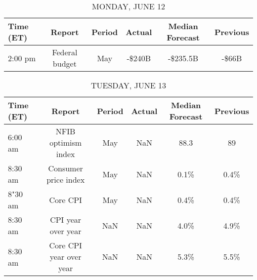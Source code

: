 \documentclass{article}%
\begin{document}
%
\normalsize%


\begin{table}[htbp]%
\caption{MONDAY, JUNE 12}%
\centering%
\begin{adjustbox}{width=1\textwidth}%
\begin{tabular}{lccccc}
\toprule
Time (ET) &         Report & Period & Actual & Median Forecast & Previous \\
\midrule
  2:00 pm & Federal budget &    May & -\$240B &        -\$235.5B &    -\$66B \\
\bottomrule
\end{tabular}
%
\end{adjustbox}%
\end{table}

%


\begin{table}[htbp]%
\caption{TUESDAY, JUNE 13}%
\centering%
\begin{adjustbox}{width=1\textwidth}%
\begin{tabular}{lccccc}
\toprule
Time (ET) &                  Report & Period & Actual & Median Forecast & Previous \\
\midrule
  6:00 am &     NFIB optimism index &    May &    NaN &            88.3 &       89 \\
  8:30 am &    Consumer price index &    May &    NaN &            0.1\% &     0.4\% \\
  8"30 am &                Core CPI &    May &    NaN &            0.4\% &     0.4\% \\
  8:30 am &      CPI year over year &    NaN &    NaN &            4.0\% &     4.9\% \\
  8:30 am & Core CPI year over year &    NaN &    NaN &            5.3\% &     5.5\% \\
\bottomrule
\end{tabular}
%
\end{adjustbox}%
\end{table}

%
\end{document}
